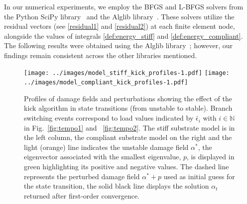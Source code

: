 \documentclass[10pt]{article}
\begin{document}
In our numerical experiments, we employ the BFGS and L-BFGS solvers from the Python SciPy library~\cite{2020SciPy-NMeth} and the Alglib library~\cite{Bochkanov2013-lk}. These solvers utilize the residual vectors (see \ref{residual1} and \ref{residual2}) at each finite element node, alongside the values of integrals \eqref{def:energy_stiff} and \eqref{def:energy_compliant}.
The following results were obtained using the Alglib library~\cite{Bochkanov2013-lk}; however, our findings remain consistent across the other libraries mentioned.



\begin{figure}[htbp]
    \centering
    \texttt{[image: ../images/model\_stiff\_kick\_profiles-1.pdf]}
    \texttt{[image: ../images/model\_compliant\_kick\_profiles-1.pdf]}
    \caption{
        Profiles of damage fields and perturbations showing the effect of the kick algorithm in state transitions (from unstable to stable). Branch switching events correspond to load values indicated by $\bar \epsilon_i$ with $i\in \mathbb N$ in {Fig.~\ref{fig:tempo1} and ~\ref{fig:tempo2}}. The stiff substrate model is in the left column, the compliant substrate model on the right and  the light (orange) line indicates the unstable damage field $\alpha^*$, the eigenvector associated with  the smallest eigenvalue, $p$, is displayed in green highlighting its positive and negative values. The dashed line represents the perturbed damage field  $\alpha^*+p$ used as initial guess for the state transition, the solid black line displays the solution $\alpha_t$ returned after first-order convergence.}
    \label{fig:kick}
\end{figure}
\end{document}
